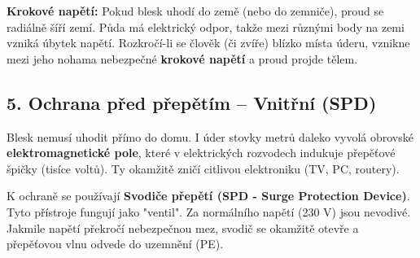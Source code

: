 \documentclass[a4paper,10pt]{article}
\begin{document}
\begin{vysvetlenibox}
\begin{center}
\end{center}

\begin{durazbox}
\textbf{Krokové napětí:} Pokud blesk uhodí do země (nebo do zemniče), proud se radiálně šíří zemí. Půda má elektrický odpor, takže mezi různými body na zemi vzniká úbytek napětí. Rozkročí-li se člověk (či zvíře) blízko místa úderu, vznikne mezi jeho nohama nebezpečné \textbf{krokové napětí} a proud projde tělem.
\end{durazbox}

\subsection*{5. Ochrana před přepětím – Vnitřní (SPD)}

Blesk nemusí uhodit přímo do domu. I úder stovky metrů daleko vyvolá obrovské \textbf{elektromagnetické pole}, které v elektrických rozvodech indukuje přepěťové špičky (tisíce voltů). Ty okamžitě zničí citlivou elektroniku (TV, PC, routery).

K ochraně se používají \textbf{Svodiče přepětí (SPD - Surge Protection Device)}. Tyto přístroje fungují jako "ventil". Za normálního napětí (230 V) jsou nevodivé. Jakmile napětí překročí nebezpečnou mez, svodič se okamžitě otevře a přepěťovou vlnu odvede do uzemnění (PE).


\end{vysvetlenibox}
\end{document}
